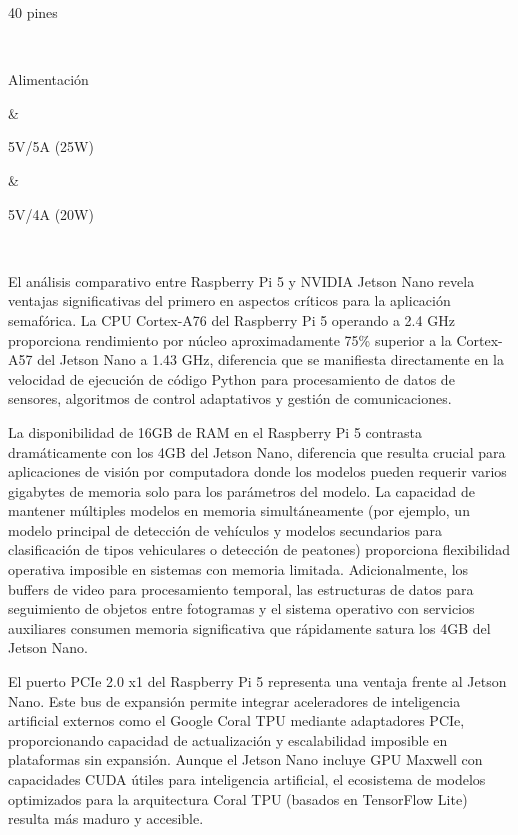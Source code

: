 \documentclass[12pt,a4paper,oneside]{report}
\begin{document}
\begin{longtable}[]
\begin{minipage}[b]{\linewidth}
40 pines
\end{minipage} \\
\begin{minipage}[b]{\linewidth}\raggedright
Alimentación
\end{minipage} & \begin{minipage}[b]{\linewidth}\raggedright
5V/5A (25W)
\end{minipage} & \begin{minipage}[b]{\linewidth}\raggedright
5V/4A (20W)
\end{minipage} \\
\midrule
\endhead
\bottomrule
\endlastfoot
\end{longtable}

El análisis comparativo entre Raspberry Pi 5 y NVIDIA Jetson Nano revela ventajas significativas del primero en aspectos críticos para la aplicación semafórica. La CPU Cortex-A76 del Raspberry Pi 5 operando a 2.4 GHz proporciona rendimiento por núcleo aproximadamente 75\% superior a la Cortex-A57 del Jetson Nano a 1.43 GHz, diferencia que se manifiesta directamente en la velocidad de ejecución de código Python para procesamiento de datos de sensores, algoritmos de control adaptativos y gestión de comunicaciones.

La disponibilidad de 16GB de RAM en el Raspberry Pi 5 contrasta dramáticamente con los 4GB del Jetson Nano, diferencia que resulta crucial para aplicaciones de visión por computadora donde los modelos pueden requerir varios gigabytes de memoria solo para los parámetros del modelo. La capacidad de mantener múltiples modelos en memoria simultáneamente (por ejemplo, un modelo principal de detección de vehículos y modelos secundarios para clasificación de tipos vehiculares o detección de peatones) proporciona flexibilidad operativa imposible en sistemas con memoria limitada. Adicionalmente, los buffers de video para procesamiento temporal, las estructuras de datos para seguimiento de objetos entre fotogramas y el sistema operativo con servicios auxiliares consumen memoria significativa que rápidamente satura los 4GB del Jetson Nano.

El puerto PCIe 2.0 x1 del Raspberry Pi 5 representa una ventaja frente al Jetson Nano. Este bus de expansión permite integrar aceleradores de inteligencia artificial externos como el Google Coral TPU mediante adaptadores PCIe, proporcionando capacidad de actualización y escalabilidad imposible en plataformas sin expansión. Aunque el Jetson Nano incluye GPU Maxwell con capacidades CUDA útiles para inteligencia artificial, el ecosistema de modelos optimizados para la arquitectura Coral TPU (basados en TensorFlow Lite) resulta más maduro y accesible.
\end{document}
